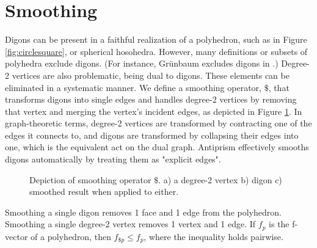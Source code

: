\documentclass[12pt]{amsart}%
\begin{document}
\section{Smoothing}

Digons can be present in a faithful realization of a polyhedron, such as in
Figure \ref{fig:circlesquare}, or spherical hosohedra. However, many
definitions or subsets of polyhedra exclude digons. (For instance, Gr\"unbaum
excludes digons in \cite{grunbaum03}.) Degree-2 vertices are also problematic,
being dual to digons. These elements can be eliminated in a systematic manner.
We define a smoothing operator, $\$$, that transforms digons into single edges
and handles degree-2 vertices by removing that vertex and merging the vertex's
incident edges, as depicted in Figure \ref{fig:smooth}. In graph-theoretic
terms, degree-2 vertices are transformed by contracting one of the edges it
connects to, and digons are transformed by collapsing their edges into one,
which is the equivalent act on the dual graph. \cite{gross} Antiprism
effectively smooths digons automatically by treating them as "explicit edges".

\begin{figure} [!htbp]

\caption{Depiction of smoothing operator $\$$. a) a degree-2 vertex b) digon c)
        smoothed result when applied to either.}
\label{fig:smooth}
\end{figure}

Smoothing a single digon removes 1 face and 1 edge from the polyhedron.
Smoothing a single degree-2 vertex removes 1 vertex and 1 edge.
If $f_p$ is the f-vector of a polyhedron, then $f_{\$p} \le f_p$, where the
inequality holds pairwise.
\end{document}
